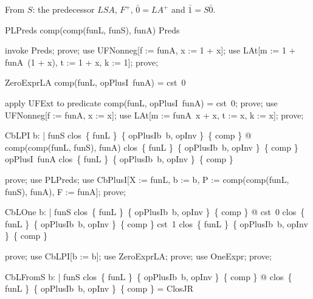 \documentclass{article}
\begin{document}
From $S$: the predecessor $L S A$, $F^+$, $\bar 0 = L A^+$ and $\bar 1 = S \bar 0$.

\begin{theorem}{PLPreds}
  comp(comp(funL, funS), funA) \in Preds
\end{theorem}

\begin{zproof}
invoke Preds;
prove;
use UFNonneg[f := funA, x := 1 + x];
use LAt[m := 1 + funA~(1 + x), t := 1 + x, k := 1];
prove;
\end{zproof}

\begin{theorem}{ZeroExprLA}
  comp(funL, opPlusI~funA) = cst~0
\end{theorem}

\begin{zproof}
apply UFExt to predicate comp(funL, opPlusI~funA) = cst~0;
prove;
use UFNonneg[f := funA, x := x];
use LAt[m := funA~x + x, t := x, k := x];
prove;
\end{zproof}

\begin{theorem}{CbLPI}
  \forall b: \nat | funS \in clos~\{ funL \}~\{ opPlusIb~b, opInv \}~\{ comp \} @ comp(comp(funL, funS), funA) \in clos~\{ funL \}~\{ opPlusIb~b, opInv \}~\{ comp \} \land opPlusI~funA \in clos~\{ funL \}~\{ opPlusIb~b, opInv \}~\{ comp \}
\end{theorem}

\begin{zproof}
prove;
use PLPreds;
use CbPlusI[X := funL, b := b, P := comp(comp(funL, funS), funA), F := funA];
prove;
\end{zproof}

\begin{theorem}{CbLOne}
  \forall b: \nat | funS \in clos~\{ funL \}~\{ opPlusIb~b, opInv \}~\{ comp \} @ cst~0 \in clos~\{ funL \}~\{ opPlusIb~b, opInv \}~\{ comp \} \land cst~1 \in clos~\{ funL \}~\{ opPlusIb~b, opInv \}~\{ comp \}
\end{theorem}

\begin{zproof}
prove;
use CbLPI[b := b];
use ZeroExprLA;
prove;
use OneExpr;
prove;
\end{zproof}

\begin{theorem}{CbLFromS}
  \forall b: \nat | funS \in clos~\{ funL \}~\{ opPlusIb~b, opInv \}~\{ comp \} @ clos~\{ funL \}~\{ opPlusIb~b, opInv \}~\{ comp \} = ClosJR
\end{theorem}
\end{document}
